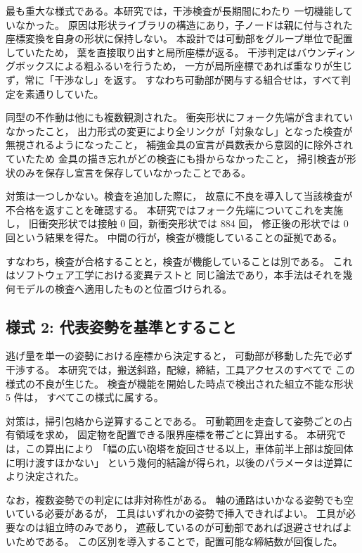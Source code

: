 \documentclass[a4paper,10pt,twocolumn]{ltjsarticle}
\begin{document}
最も重大な様式である。本研究では，干渉検査が長期間にわたり
一切機能していなかった。
原因は形状ライブラリの構造にあり，子ノードは親に付与された
座標変換を自身の形状に保持しない。
本設計では可動部をグループ単位で配置していたため，
葉を直接取り出すと局所座標が返る。
干渉判定はバウンディングボックスによる粗ふるいを行うため，
一方が局所座標であれば重なりが生じず，常に「干渉なし」を返す。
すなわち可動部が関与する組合せは，すべて判定を素通りしていた。

同型の不作動は他にも複数観測された。
衝突形状にフォーク先端が含まれていなかったこと，
出力形式の変更により全リンクが「対象なし」となった検査が
無視されるようになったこと，
補強金具の宣言が員数表から意図的に除外されていたため
金具の描き忘れがどの検査にも掛からなかったこと，
掃引検査が形状のみを保存し宣言を保存していなかったことである。

対策は一つしかない。検査を追加した際に，
故意に不良を導入して当該検査が不合格を返すことを確認する。
本研究ではフォーク先端についてこれを実施し，
旧衝突形状では接触 0 回，新衝突形状では 884 回，
修正後の形状では 0 回という結果を得た。
中間の行が，検査が機能していることの証拠である。

すなわち，検査が合格することと，検査が機能していることは別である。
これはソフトウェア工学における変異テスト\cite{demillo1978,jia2011}と
同じ論法であり，本手法はそれを幾何モデルの検査へ適用したものと位置づけられる。

\subsection{様式 2: 代表姿勢を基準とすること}

逃げ量を単一の姿勢における座標から決定すると，
可動部が移動した先で必ず干渉する。
本研究では，搬送斜路，配線，締結，工具アクセスのすべてで
この様式の不良が生じた。
検査が機能を開始した時点で検出された組立不能な形状 5 件は，
すべてこの様式に属する。

対策は，掃引包絡から逆算することである。
可動範囲を走査して姿勢ごとの占有領域を求め，
固定物を配置できる限界座標を帯ごとに算出する。
本研究では，この算出により
「幅の広い砲塔を旋回させる以上，車体前半上部は旋回体に明け渡すほかない」
という幾何的結論が得られ，以後のパラメータは逆算により決定された。

なお，複数姿勢での判定には非対称性がある。
軸の通路はいかなる姿勢でも空いている必要があるが，
工具はいずれかの姿勢で挿入できればよい。
工具が必要なのは組立時のみであり，
遮蔽しているのが可動部であれば退避させればよいためである。
この区別を導入することで，配置可能な締結数が回復した。
\end{document}
